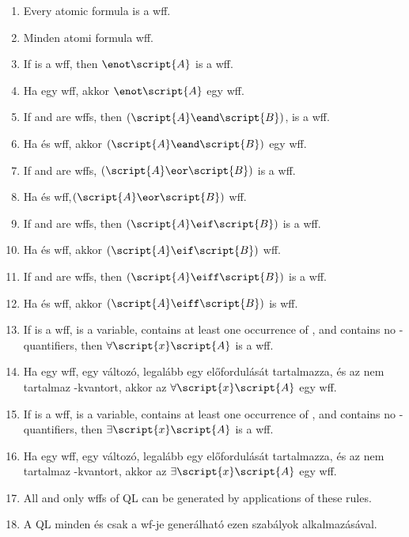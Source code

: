 \begin{enumerate}
\item Every atomic formula is a wff.
\item Minden atomi formula wff.

\item If  is a wff, then $\enot\script{A}$ is a wff.
\item Ha  egy wff, akkor $\enot\script{A}$ egy wff.

\item If  and  are wffs, then $(\script{A}\eand\script{B})$, is a wff.
\item  Ha  és  wff, akkor $(\script{A}\eand\script{B})$ egy wff.

\item If  and  are wffs, $(\script{A}\eor\script{B})$ is a wff.
\item Ha  és  wff,$(\script{A}\eor\script{B})$ wff.

\item If  and  are wffs, then $(\script{A}\eif\script{B})$ is a wff.
\item Ha  és   wff, akkor $(\script{A}\eif\script{B})$ wff.

\item If  and  are wffs, then $(\script{A}\eiff\script{B})$ is a wff.
\item Ha  és  wff, akkor $(\script{A}\eiff\script{B})$ is wff.

\item If  is a wff,  is a variable,  contains at least one occurrence of , and  contains no -quantifiers, then $\forall\script{x}\script{A}$ is a wff.
\item Ha  egy wff,  egy változó,  legalább egy  előfordulását tartalmazza, és az  nem tartalmaz -kvantort, akkor az $\forall\script{x}\script{A}$ egy wff.

\item If  is a wff,  is a variable,  contains at least one occurrence of , and  contains no -quantifiers, then $\exists\script{x}\script{A}$ is a wff.
\item Ha  egy wff,  egy változó,  legalább egy  előfordulását tartalmazza, és az  nem tartalmaz -kvantort, akkor az $\exists\script{x}\script{A}$ egy wff.

\item All and only wffs of QL can be generated by applications of these rules.
\item A QL minden és csak a wf-je generálható ezen szabályok alkalmazásával.
\end {enumerate}

